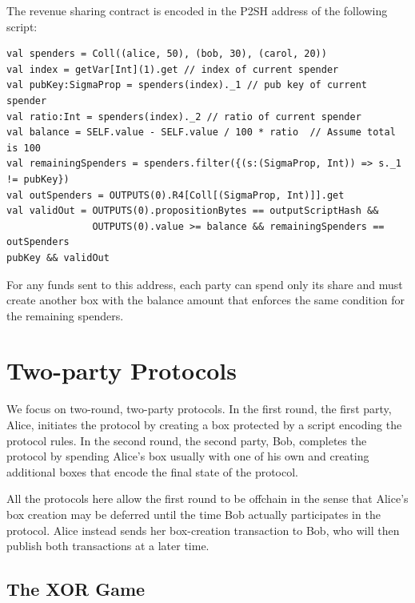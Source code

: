 \documentclass[11pt]{article}
\begin{document}
{The revenue sharing contract is encoded in the P2SH address of the following script: 
\begin{verbatim}
val spenders = Coll((alice, 50), (bob, 30), (carol, 20))
val index = getVar[Int](1).get // index of current spender 
val pubKey:SigmaProp = spenders(index)._1 // pub key of current spender
val ratio:Int = spenders(index)._2 // ratio of current spender
val balance = SELF.value - SELF.value / 100 * ratio  // Assume total is 100
val remainingSpenders = spenders.filter({(s:(SigmaProp, Int)) => s._1 != pubKey})
val outSpenders = OUTPUTS(0).R4[Coll[(SigmaProp, Int)]].get
val validOut = OUTPUTS(0).propositionBytes == outputScriptHash &&
               OUTPUTS(0).value >= balance && remainingSpenders == outSpenders
pubKey && validOut
\end{verbatim}

For any funds sent to this address, each party can spend only its share and must create another box with the balance amount that enforces the same condition for the remaining spenders.

}

\section{Two-party Protocols}

We focus on two-round, two-party protocols. %
In the first round, the first party, Alice, initiates the protocol by creating a box  protected by a script encoding the protocol rules. In the second round, the second party, Bob, completes the protocol by spending Alice's box usually with one of his own and creating additional boxes that encode the final state of the protocol. 

All the protocols here allow the first round to be offchain in the sense that Alice's box creation may be deferred until the time Bob actually participates in the protocol. Alice instead sends her box-creation transaction to Bob, who will then publish both transactions at a later time. 
\subsection{The XOR Game}
\end{document}
